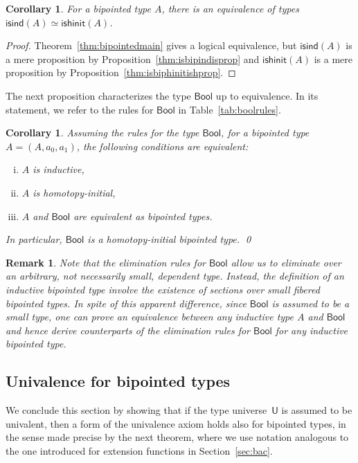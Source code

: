 \documentclass[10pt,a4paper,oneside,reqno]{amsart}
\numberwithin{equation}{section}
\theoremstyle{mythm}
\newtheorem{corollary}[theorem]{Corollary}
\theoremstyle{mydef}
\theoremstyle{myrmk}
\newtheorem{remark}[theorem]{Remark}
\newcommand{\ie}{\text{i.e.\ }}
\newcommand{\isbipind}{\mathsf{isind}}
\newcommand{\isbiphinit}{\mathsf{ishinit}}
\newcommand{\Bool}{\mathsf{Bool}}
\newcommand{\U}{\mathsf{U}}
\begin{document}
\begin{corollary} For a bipointed type $A$, there is an equivalence of types $\isbipind(A)\simeq   \isbiphinit(A)$.
\end{corollary} 

\begin{proof} Theorem~\ref{thm:bipointedmain} gives a logical equivalence, but  $\isbipind(A)$ is a 
mere proposition by Proposition~\ref{thm:isbipindisprop} and $\isbiphinit(A)$ is a mere proposition
by Proposition~\ref{thm:isbiphinitishprop}. 
\end{proof}

The next proposition characterizes the
type $\Bool$ up to equivalence. In its statement, we refer to the rules for $\Bool$ in
Table~\ref{tab:boolrules}.



\begin{corollary} Assuming the rules for the type $\Bool$, for a bipointed type $A = (A, a_0, a_1)$, the following 
conditions are equivalent:
\begin{enumerate}[(i)]
\item $A$ is inductive,
\item $A$ is homotopy-initial,
\item $A$ and $\Bool$ are equivalent as bipointed types.
\end{enumerate}
In particular, $\Bool$ is a homotopy-initial bipointed type. \qed
\end{corollary}



\begin{remark} \label{thm:smallelimination} Note that the elimination rules for $\Bool$ allow us to eliminate 
over an arbitrary, \ie not necessarily small, dependent type. Instead, the definition of an inductive bipointed
type involve the existence of sections over small fibered bipointed types. In spite of this apparent difference,
since $\Bool$ is assumed to be a small type, one can prove an equivalence between any inductive type $A$
and $\Bool$ and hence derive counterparts of the elimination rules for $\Bool$ for any inductive bipointed type. 
\end{remark} 



\subsection*{Univalence for bipointed types} \label{sec:unibip}
We conclude this section by showing that if the type universe~$\U$ is assumed to be univalent, then a form of the univalence axiom holds also for bipointed types, in the sense made precise by the next theorem, where we
use notation analogous to the one introduced for extension functions in Section~\ref{sec:bac}. 
\end{document}
